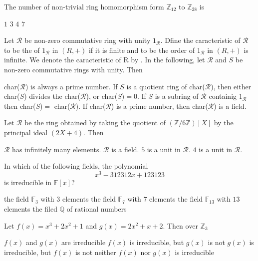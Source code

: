 \documentclass[10pt]{exam}
\begin{document}
\begin{questions}
\question
The number of non-trivial ring homomorphism form $\mathbb{Z}_{12}$ to $\mathbb{Z}_{28}$ is

\begin{oneparchoices}
\choice $1$
\choice $3$
\choice $4$
\choice $7$  
\end{oneparchoices}

\question
Let $\mathcal{R}$ be non-zero commutative ring with unity $1_{\mathcal{R}}$. Dfine the caracteristic of $\mathcal{R}$ to be the of $1_{\mathcal{R}}$ in $(R,+)$ if it is finite and to be the order of $1_{\mathcal{R}}$ in  $(R,+)$ is infinite. We denote the caracteristic of R by . In the following, let $\mathcal{R}$ and $S$ be non-zero commutative rings with unity. Then

\begin{checkboxes}
\choice char($\mathcal{R}$) is always a prime number. 
\choice If $S$ is a quotient ring of char($\mathcal{R}$), then either char($S$) divides the char($\mathcal{R}$), or char($S$)$=0$.
\choice If $S$ is a subring of $\mathcal{R}$ containig $1_{\mathcal{R}}$ then char($S$)$=$ char($\mathcal{R}$).
\choice If char($\mathcal{R}$) is a prime number, then char($\mathcal{R}$) is a field.
\end{checkboxes}

\question
Let $\mathcal{R}$ be the ring obtained by taking the quotient of $(\mathbb{Z}/6\mathbb{Z})[X]$ by the principal ideal $(2X+4)$. Then

\begin{checkboxes}
\choice $\mathcal{R}$ has infinitely many elements.
\choice $\mathcal{R}$ is a field.
\choice $5$ is a unit in $\mathcal{R}$.
\choice $4$ is a unit in $\mathcal{R}$.
\end{checkboxes}


\question
In which of the following fields, the polynomial
$$x^3-312312x+123123$$
is irreducible in $\mathbb{F}[x]$?
\begin{choices}
\choice the field $\mathbb{F}_3$ with $3$ elements
\choice the field $\mathbb{F}_7$ with $7$ elements
\choice the field $\mathbb{F}_{13}$ with $13$ elements
\choice the filed $\mathbb{Q}$ of rational numbers
\end{choices}

\question
Let $f(x)=x^3+2x^2+1$ and $g(x)=2x^2+x+2$. Then over $\mathbb{Z}_3$

\begin{choices}
\choice $f(x)$ and $g(x)$ are irreducible 
\choice $f(x)$ is irreducible, but $g(x)$ is not
\choice $g(x)$ is irreducible, but $f(x)$ is not
\choice neither $f(x)$ nor $g(x)$ is irreducible
\end{choices}


\end{questions}
\end{document}
